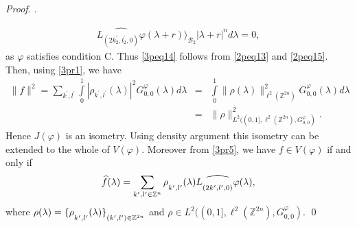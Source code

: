 \documentclass[a4paper,12pt,reqno]{amsart}
\theoremstyle{plain}
\numberwithin{equation}{section}
\theoremstyle{definition}
\newenvironment{pf}[1][]{%
 \vskip 3mm
 \noindent
 \ifthenelse{\equal{#1}{}}%
  {{\slshape Proof. }}%
  {{\slshape #1.} }%
 }%
{\qed\bigskip}
\begin{document}
\begin{pf}
\begin{eqnarray*}
\widehat{L_{(2k_{2}^{\prime},l_{2}^{\prime},0)}\varphi}(\lambda+r)\rangle
_{\mathcal{B}_{2}}|\lambda+r|^{n}d\lambda=0,
\end{eqnarray*}
as $\varphi$ satisfies condition C. Thus \eqref{3peq14} follows from \eqref{2peq13} and \eqref{2peq15}. Then, using \eqref{3pr1}, we have
\begin{eqnarray*}
\|f\|^{2}=\sum\limits_{k^{\prime},l^{\prime}}\int\limits_{0}^{1} |\rho_{k^{\prime},l^{\prime}}(\lambda)|^{2} G_{0,0}^{\varphi}(\lambda) d\lambda
&=&\int\limits_{0}^{1} \|\rho(\lambda)\|_{\ell^{2}(\mathbb{Z}^{2n})}^{2}G_{0,0}^{\varphi}(\lambda) d\lambda\\
&=&\|\rho\|_{L^{2}((0,1],\ell^{2}(\mathbb{Z}^{2n}),G_{0,0}^{\varphi})}^{2}.
\end{eqnarray*}
Hence $J(\varphi)$ is an isometry. Using density argument this isometry can be extended to the whole of $V(\varphi)$. Moreover from \eqref{3pr5}, we have $f\in V(\varphi)$ if and only if
\begin{eqnarray}\label{3peq13}
\widehat{f}(\lambda)=\sum\limits_{k^{\prime},l^{\prime}\in\mathbb{Z}^{n}}
\fontdimen16\textfont2=5pt \rho_{k^{\prime},l^{\prime}}(\lambda)\widehat{L_{(2k^{\prime},l^{\prime},
0)}\varphi}(\lambda),
\end{eqnarray}
where $\rho(\lambda)=\{\fontdimen16\textfont2=5pt \rho_{k^{\prime},l^{\prime}}(\lambda)\}_
{(k^{\prime},l^{\prime})\in\mathbb{Z}^{2n}}$ and $\rho\in L^{2}((0,1],\ell^{2}(\mathbb{Z}^{2n}),G_{0,0}^{\varphi})$.
\end{pf}
\end{document}
